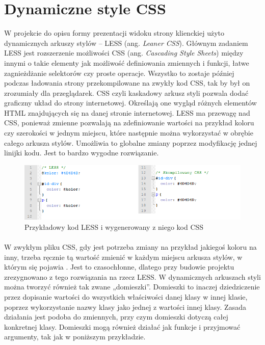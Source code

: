 \section{Dynamiczne style CSS}
W projekcie do opisu formy prezentacji widoku strony klienckiej użyto dynamicznych arkuszy stylów – LESS (ang. \textit{Leaner CSS}). Głównym zadaniem LESS jest rozszerzenie możliwości CSS (ang. \textit{Cascading Style Sheets}) między innymi o takie elementy jak możliwość definiowania zmiennych i funkcji, łatwe zagnieżdżanie selektorów czy proste operacje. Wszystko to zostaje później podczas ładowania strony przekompilowane na zwykły kod CSS, tak by był on zrozumiały dla przeglądarek. CSS czyli kaskadowy arkusz styli pozwala dodać graficzny układ do strony internetowej. Określają one wygląd różnych elementów HTML znajdujących się na danej stronie internetowej. 
LESS ma przewagę nad CSS, ponieważ zmienne pozwalają na zdefiniowanie wartości na przykład koloru czy szerokości w jednym miejscu, które następnie można wykorzystać w obrębie całego arkusza stylów. Umożliwia to globalne zmiany poprzez modyfikację jednej linijki kodu. Jest to bardzo wygodne rozwiązanie. 

\begin{figure}[h]
	\centering
	\includegraphics[width=1.00\textwidth]{images/less1.png}
	\caption{Przykładowy kod LESS i wygenerowany z niego kod CSS}
\end{figure}
\paragraph{}
W zwykłym pliku CSS, gdy jest potrzeba zmiany na przykład jakiegoś koloru na inny, trzeba ręcznie tą wartość zmienić w każdym miejscu arkusza stylów, w którym się pojawia \cite{cssBook}. Jest to czasochłonne, dlatego przy budowie projektu zrezygnowano z tego rozwiązania na rzecz LESS. 
W dynamicznych arkuszach styli można tworzyć również tak zwane „domieszki”. Domieszki to inaczej dziedziczenie przez dopisanie wartości do wszystkich właściwości danej klasy w innej klasie, poprzez wykorzystanie nazwy klasy jako jednej z wartości innej klasy. Zasada działania jest podoba do zmiennych, przy czym domieszki dotyczą całej konkretnej klasy. Domieszki mogą również działać jak funkcje i przyjmować argumenty, tak jak w poniższym przykładzie.

